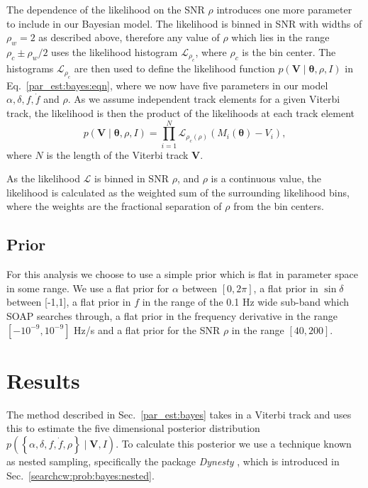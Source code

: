 The dependence of the likelihood on the \gls{SNR} $\rho$ introduces one more parameter
to include in our Bayesian model.  
The likelihood is binned in \gls{SNR} with widths of $\rho_w = 2$ as described above, therefore any value of $\rho$ which lies in the range $\rho_c \pm \rho_w/2 $ uses the likelihood histogram $\mathcal{L}_{\rho_c}$, where $\rho_c$ is the bin center.
The histograms $\mathcal{L}_{\rho_c}$ are then used to define the likelihood function $p(\bm{V} \mid
\bm{\theta}, \rho, I)$ in Eq.~\ref{par_est:bayes:eqn}, where we now have five parameters in our model
$\alpha, \delta, f, \dot{f}$ and $\rho$.  As we assume
independent track elements for a given Viterbi track, the likelihood is then the product of the likelihoods at each track element
%
\begin{equation} 
p(\bm{V} \mid \bm{\theta}, \rho, I) = \prod_{i =
1}^{N} \mathcal{L}_{\rho_c(\rho)}(M_i(\bm{\theta}) - V_i) , 
\end{equation} 
%
where $N$ is the length of the Viterbi track $\bm{V}$. 

\if
As the likelihood $\mathcal{L}$ is binned in \gls{SNR} $\rho$, and $\rho$ is a
continuous value, the likelihood is calculated as the weighted sum of the
surrounding likelihood bins, where the weights are the fractional separation of
$\rho$ from the bin centers.  
\fi

%
\subsection{Prior}
%
For this analysis we choose to use a simple prior which is flat in parameter space in some range.  We use a flat prior for $\alpha$
between $[0,2\pi]$, a flat prior in $\sin{\delta}$ between [-1,1], a flat prior
in $f$ in the range of the 0.1 Hz wide sub-band which SOAP searches through, a
flat prior in the frequency derivative in the range
$[-10^{-9},10^{-9}]$ Hz/s and a flat prior for the \gls{SNR} $\rho$ in
the range $[40,200]$.


\section{\label{par_est:results}Results}

The method described in Sec.~\ref{par_est:bayes} takes in a Viterbi track and
uses this to estimate the five dimensional posterior distribution
$p\left(\left\{ \alpha, \delta, f, \dot{f}, \rho \right\} \mid \bm{V}, I
\right)$.  To calculate this posterior we use a technique known as nested
sampling, specifically the package {\it Dynesty}
\citep{speagle2019DynestyDynamic}, which is introduced in
Sec.~\ref{searchcw:prob:bayes:nested}.

